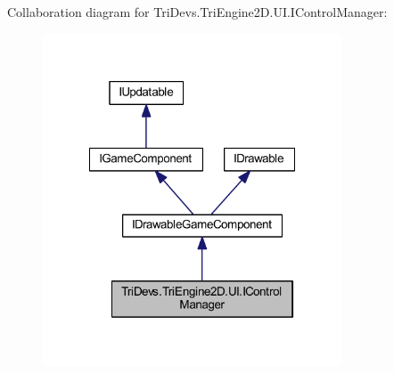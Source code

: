 Collaboration diagram for Tri\-Devs.\-Tri\-Engine2\-D.\-U\-I.\-I\-Control\-Manager\-:\nopagebreak
\begin{figure}[H]
\begin{center}
\leavevmode
\includegraphics[width=251pt]{interface_tri_devs_1_1_tri_engine2_d_1_1_u_i_1_1_i_control_manager__coll__graph}
\end{center}
\end{figure}
